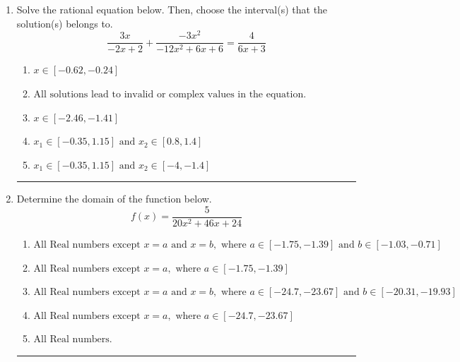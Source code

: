\documentclass[14pt]{extbook}
\newcommand{\litem}[1]{\item#1\hspace*{-1cm}\rule{\textwidth}{0.4pt}}
\begin{document}
\begin{enumerate}
{\begin{enumerate}[label=\Alph*.]
\end{enumerate} }
\litem{
Solve the rational equation below. Then, choose the interval(s) that the solution(s) belongs to.\[ \frac{3x}{-2x + 2} + \frac{-3x^{2}}{-12x^{2} +6 x + 6} = \frac{4}{6x + 3} \]\begin{enumerate}[label=\Alph*.]
\item \( x \in [-0.62,-0.24] \)
\item \( \text{All solutions lead to invalid or complex values in the equation.} \)
\item \( x \in [-2.46,-1.41] \)
\item \( x_1 \in [-0.35, 1.15] \text{ and } x_2 \in [0.8,1.4] \)
\item \( x_1 \in [-0.35, 1.15] \text{ and } x_2 \in [-4,-1.4] \)

\end{enumerate} }
\litem{
Determine the domain of the function below.\[ f(x) = \frac{5}{20x^{2} +46 x + 24} \]\begin{enumerate}[label=\Alph*.]
\item \( \text{All Real numbers except } x = a \text{ and } x = b, \text{ where } a \in [-1.75, -1.39] \text{ and } b \in [-1.03, -0.71] \)
\item \( \text{All Real numbers except } x = a, \text{ where } a \in [-1.75, -1.39] \)
\item \( \text{All Real numbers except } x = a \text{ and } x = b, \text{ where } a \in [-24.7, -23.67] \text{ and } b \in [-20.31, -19.93] \)
\item \( \text{All Real numbers except } x = a, \text{ where } a \in [-24.7, -23.67] \)
\item \( \text{All Real numbers.} \)

\end{enumerate} }
\end{enumerate}
\end{document}
